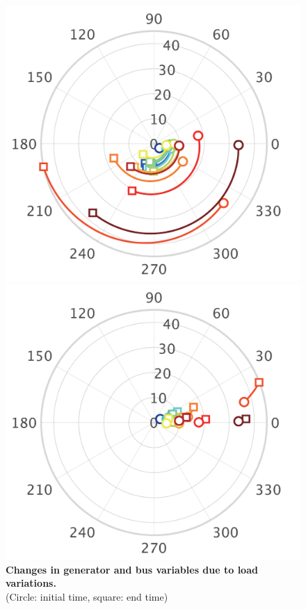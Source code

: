 \documentclass[graybox, envcountchap]{svmult}
\begin{document}
\begin{figure}[t!]
{\begin{minipage}{0.49\linewidth}
  \end{minipage}
 \begin{minipage}{0.49\linewidth}
    \centering
    \includegraphics[width = 0.9\linewidth]{figs/Ipolar}
    \medskip
  \end{minipage}
  \begin{minipage}{0.49\linewidth}
    \centering
    \includegraphics[width = 0.9\linewidth]{figs/PQpolar}
    \medskip
  \end{minipage}
  }
  \medskip
  \caption{\textbf{Changes in generator and bus variables due to load variations.  }
  \\  \centering(Circle: initial time, square: end time)}
  \label{fig:polars}
\medskip
\end{figure}
\end{document}
